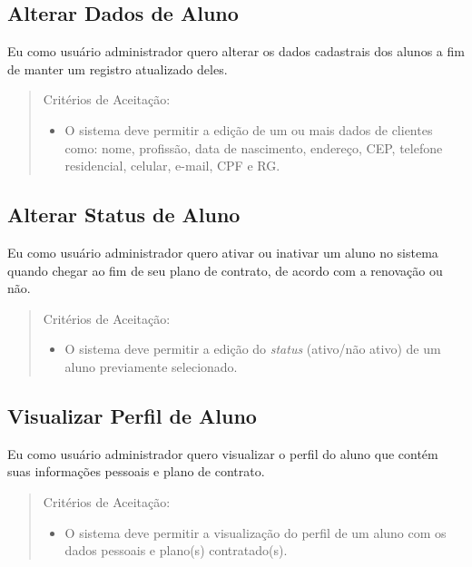 \subsection[Alterar Dados de Aluno]{Alterar Dados de Aluno}
Eu como usuário administrador quero alterar os dados cadastrais dos alunos a fim
de manter um registro atualizado deles.

\begin{quote}
Critérios de Aceitação:
    \begin{itemize}
        \item O sistema deve permitir a edição de um ou mais dados de clientes como: nome,
        profissão, data de nascimento, endereço, CEP, telefone residencial, celular,
        e-mail, CPF e RG.
    \end{itemize}
\end{quote}

\subsection[Alterar Status de Aluno]{Alterar Status de Aluno}
Eu como usuário administrador quero ativar ou inativar um aluno no sistema
quando chegar ao fim de seu plano de contrato, de acordo com a renovação ou não.

\begin{quote}
Critérios de Aceitação:
    \begin{itemize}
        \item O sistema deve permitir a edição do \textsl{status} (ativo/não ativo) de um aluno
        previamente selecionado.
    \end{itemize}
\end{quote}

\subsection[Visualizar Perfil de Aluno]{Visualizar Perfil de Aluno}
Eu como usuário administrador quero visualizar o perfil do aluno que contém suas
informações pessoais e plano de contrato.

\begin{quote}
Critérios de Aceitação:
    \begin{itemize}
        \item O sistema deve permitir a visualização do perfil de um aluno com os dados pessoais e plano(s) contratado(s).
    \end{itemize}
\end{quote}

